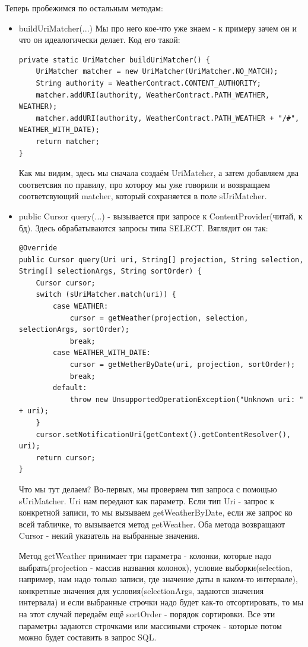 \documentclass[12 pt]{article}
\begin{document}
	    Теперь пробежимся по остальным методам:
	    \begin{itemize}	
	    \item buildUriMatcher(...) Мы про него кое-что уже знаем - к примеру зачем он и что он идеалогически делает. Код его такой:
	    \begin{lstlisting}
private static UriMatcher buildUriMatcher() {
    UriMatcher matcher = new UriMatcher(UriMatcher.NO_MATCH);
    String authority = WeatherContract.CONTENT_AUTHORITY;
    matcher.addURI(authority, WeatherContract.PATH_WEATHER, WEATHER);
    matcher.addURI(authority, WeatherContract.PATH_WEATHER + "/#", WEATHER_WITH_DATE);
    return matcher;
}	    
	    \end{lstlisting}
	     Как мы видим, здесь мы сначала создаём UriMatcher, а затем добавляем два соответсвия по правилу, про котороу мы уже говорили и возвращаем соответсвующий matcher, который сохраняется в поле sUriMatcher.
	    \item public Cursor query(...) - вызывается при запросе к ContentProvider(читай, к бд). Здесь обрабатываются запросы типа SELECT.
	    Вяглядит он так:
	    \begin{lstlisting}
@Override
public Cursor query(Uri uri, String[] projection, String selection, String[] selectionArgs, String sortOrder) {
    Cursor cursor;
    switch (sUriMatcher.match(uri)) {
        case WEATHER:
            cursor = getWeather(projection, selection, selectionArgs, sortOrder);
            break;
        case WEATHER_WITH_DATE:
            cursor = getWetherByDate(uri, projection, sortOrder);
            break;
        default:
            throw new UnsupportedOperationException("Unknown uri: " + uri);
    }
    cursor.setNotificationUri(getContext().getContentResolver(), uri);
    return cursor;
}	    
	    \end{lstlisting}
	    Что мы тут делаем? Во-первых, мы проверяем тип запроса с помощью sUriMatcher. Uri нам передают как параметр. Если тип Uri - запрос к конкретной записи, то мы вызываем getWeatherByDate, если же запрос ко всей табличке, то вызывается метод getWeather. Оба метода возвращают Cursor - некий указатель на выбранные значения. 
	    
	    Метод getWeather принимает три параметра - колонки, которые надо выбрать(projection - массив названия колонок), условие выборки(selection, например, нам надо только записи, где значение даты в каком-то интервале), конкретные значения для условия(selectionArgs, задаются значения интервала) и если выбранные строчки надо будет как-то отсортировать, то мы на этот случай передаём ещё sortOrder - порядок сортировки. Все эти параметры задаются строчками или массивыми строчек - которые потом можно будет составить в запрос SQL.
	    

\end{itemize}
\end{document}
